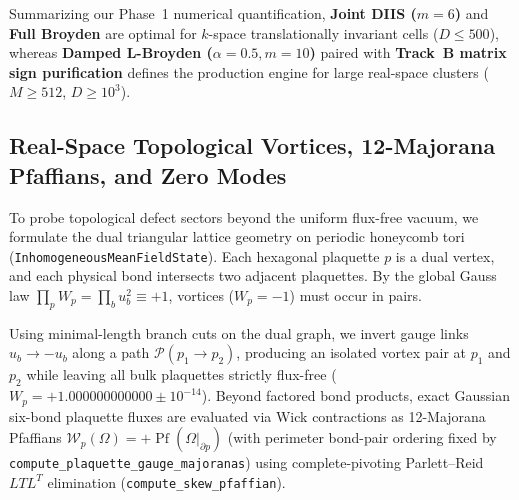 Summarizing our Phase~1 numerical quantification, \textbf{Joint DIIS ($m=6$)} and \textbf{Full Broyden} are optimal for $k$-space translationally invariant cells ($D \le 500$), whereas \textbf{Damped L-Broyden ($\alpha=0.5, m=10$)} paired with \textbf{Track~B matrix sign purification} defines the production engine for large real-space clusters ($M \ge 512$, $D \ge 10^3$).

\subsection{Real-Space Topological Vortices, 12-Majorana Pfaffians, and Zero Modes}
To probe topological defect sectors beyond the uniform flux-free vacuum, we formulate the dual triangular lattice geometry on periodic honeycomb tori (\texttt{InhomogeneousMeanFieldState}). Each hexagonal plaquette $p$ is a dual vertex, and each physical bond intersects two adjacent plaquettes. By the global Gauss law $\prod_{p} W_p = \prod_{b} u_b^2 \equiv +1$, vortices ($W_p = -1$) must occur in pairs.

Using minimal-length branch cuts on the dual graph, we invert gauge links $u_b \to -u_b$ along a path $\mathcal{P}(p_1 \to p_2)$, producing an isolated vortex pair at $p_1$ and $p_2$ while leaving all bulk plaquettes strictly flux-free ($W_p = +1.000000000000 \pm 10^{-14}$). Beyond factored bond products, exact Gaussian six-bond plaquette fluxes are evaluated via Wick contractions as 12-Majorana Pfaffians $\mathcal{W}_p(\Omega) = +\operatorname{Pf}(\Omega|_{\partial p})$ (with perimeter bond-pair ordering fixed by \texttt{compute\_plaquette\_gauge\_majoranas}) using complete-pivoting Parlett--Reid $LTL^T$ elimination (\texttt{compute\_skew\_pfaffian}).

